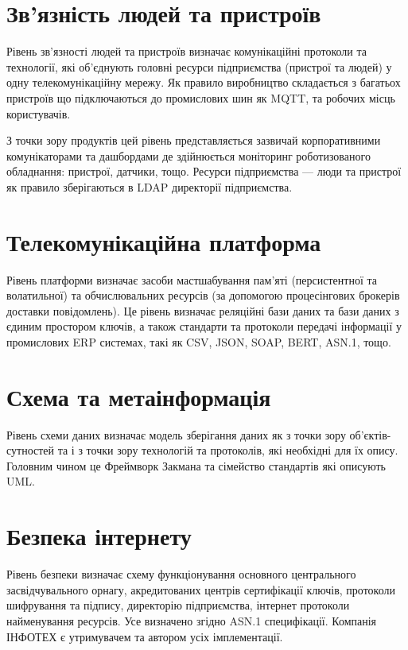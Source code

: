 \section{Зв'язність людей та пристроїв}

Рівень зв'язності людей та пристроїв визначає комунікаційні протоколи та технології,
які об'єднують головні ресурси підприємства (пристрої та людей) у одну
телекомунікаційну мережу. Як правило виробництво складається з багатьох пристроїв
що підключаються до промислових шин як MQTT, та робочих місць користувачів.

З точки зору продуктів цей рівень представляється зазвичай корпоративними
комунікаторами та дашбордами де здійнюється моніторинг роботизованого обладнання:
пристрої, датчики, тощо. Ресурси підприємства — люди та пристрої як правило
зберігаються в LDAP директорії підприємства.

\newpage
\section{Телекомунікаційна платформа}

Рівень платформи визначає засоби мастшабування пам'яті (персистентної та волатильної) та
обчислювальних ресурсів (за допомогою процесінгових брокерів доставки повідомлень).
Це рівень визначає реляційні бази даних та бази даних з єдиним простором ключів,
а також стандарти та протоколи передачі інформації у промислових ERP системах,
такі як CSV, JSON, SOAP, BERT, ASN.1, тощо.

\section{Схема та метаінформація}

Рівень схеми даних визначає модель зберігання даних як з точки зору об'єктів-сутностей
та і з точки зору технологій та протоколів, які необхідні для їх опису.
Головним чином це Фреймворк Закмана та сімейство стандартів які описують UML.

\section{Безпека інтернету}

Рівень безпеки визначає схему функціонування основного центрального засвідчувального орнагу,
акредитованих центрів сертифікації ключів, протоколи шифрування та підпису, директорію
підприємства, інтернет протоколи найменування ресурсів. Усе визначено згідно ASN.1 специфікації.
Компанія ІНФОТЕХ є утримувачем та автором усіх імплементації.

